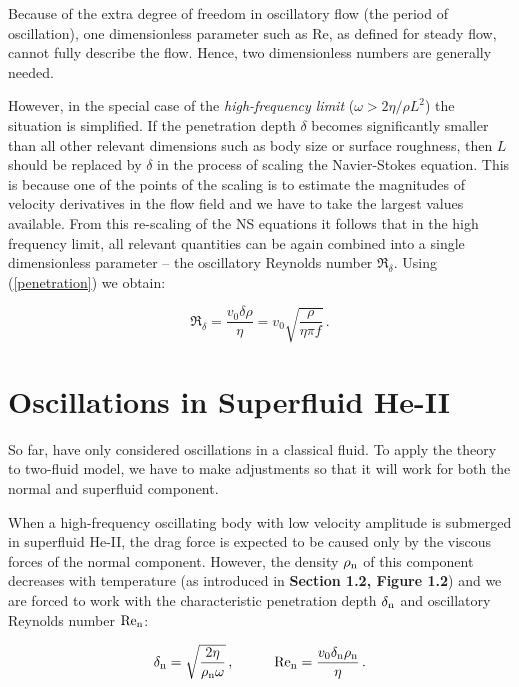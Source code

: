 Because of the extra degree of freedom in oscillatory flow (the period of oscillation), one dimensionless parameter such as Re, as defined for steady flow, cannot fully describe the flow. Hence, two dimensionless numbers are generally needed. 

However, in the special case of the \textit{high-frequency limit} ($ \omega > 2\eta / \rho L^2  $) the situation is simplified. If the penetration depth $ \delta $ becomes significantly smaller than all other relevant dimensions such as body size or surface roughness, then $ L $ should be replaced by $ \delta $ in the process of scaling the Navier-Stokes equation. This is because one of the points of the scaling is to estimate the magnitudes of velocity derivatives in the flow field and we have to take the largest values available. From this re-scaling of the NS equations it follows that in the high frequency limit, all relevant quantities can be again combined into a single dimensionless parameter -- the oscillatory Reynolds number $ \Re_{\delta} $. Using (\ref{penetration}) we obtain:

\begin{equation}
\Re_{\delta} = \frac{v_0 \delta\rho}{\eta}
= v_0 \sqrt{\frac{\rho}{\eta \pi f}} \,.
\label{Re*}
\end{equation}

\section{Oscillations in Superfluid He-II}

So far, have only considered oscillations in a classical fluid. To apply the theory to two-fluid model, we have to make adjustments so that it will work for both the normal and superfluid component. 

When a high-frequency oscillating body with low velocity amplitude is submerged in superfluid He-II, the drag force is expected to be caused only by the viscous forces of the normal component. However, the density $ \rho_{\mathrm{n}} $ of this component decreases with temperature (as introduced in {\sffamily\textbf{Section 1.2, Figure 1.2}}) and we are forced to work with the characteristic penetration depth $\delta_{\mathrm{n}}$ and oscillatory Reynolds number $\mathrm{Re}_{\mathrm{n}}$:

\begin{equation}
\delta_{\mathrm{n}} = \sqrt{\frac{2\eta}{\rho_{\mathrm{n}}\omega}}\,,
\hspace{1cm}
\mathrm{Re}_{\mathrm{n}} = \frac{v_0 \delta_{\mathrm{n}} \rho_{\mathrm{n}}}{\eta}
\label{twofluid}\,.
\end{equation}



